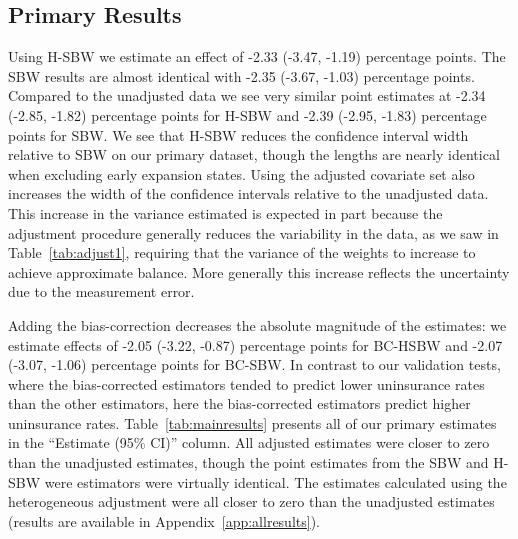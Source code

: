 \documentclass[aoas]{imsart}
\theoremstyle{plain}
\theoremstyle{remark}
\begin{document}
\subsection{Primary Results}

Using H-SBW we estimate an effect of -2.33 (-3.47, -1.19) percentage points. The SBW results are almost identical with -2.35 (-3.67, -1.03) percentage points. Compared to the unadjusted data we see very similar point estimates at -2.34 (-2.85, -1.82) percentage points for H-SBW and -2.39 (-2.95, -1.83) percentage points for SBW. We see that H-SBW reduces the confidence interval width relative to SBW on our primary dataset, though the lengths are nearly identical when excluding early expansion states. Using the adjusted covariate set also increases the width of the confidence intervals relative to the unadjusted data. This increase in the variance estimated is expected in part because the adjustment procedure generally reduces the variability in the data, as we saw in Table~\ref{tab:adjust1}, requiring that the variance of the weights to increase to achieve approximate balance. More generally this increase reflects the uncertainty due to the measurement error.

Adding the bias-correction decreases the absolute magnitude of the estimates: we estimate effects of -2.05 (-3.22, -0.87) percentage points for BC-HSBW and -2.07 (-3.07, -1.06) percentage points for BC-SBW. In contrast to our validation tests, where the bias-corrected estimators tended to predict lower uninsurance rates than the other estimators, here the bias-corrected estimators predict higher uninsurance rates. Table~\ref{tab:mainresults} presents all of our primary estimates in the ``Estimate (95\% CI)'' column. All adjusted estimates were closer to zero than the unadjusted estimates, though the point estimates from the SBW and H-SBW were estimators were virtually identical. The estimates calculated using the heterogeneous adjustment were all closer to zero than the unadjusted estimates (results are available in Appendix~\ref{app:allresults}).
\end{document}
